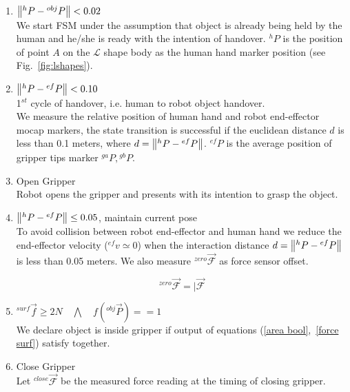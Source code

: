 \documentclass[a4paper, 12pt, oneside]{Thesis}  %
\begin{document}
\begin{enumerate}[start=0,label={\bf{t}\arabic*:}]
    \item $\norm{{}^h{P} - {}^{obj}{P}} < 0.02$\\
    We start FSM under the assumption that object is already being held by the human and he/she is ready with the intention of handover. ${}^h{P}$ is the position of point $A$ on the $\mathcal{L}$ shape body as the human hand marker position (see Fig.~\ref{fig:lshapes}).
    
    
    \item $\norm{{}^h{P} - {}^{ef}{P}} < 0.10$\\
    1$^{st}$ cycle of handover, i.e. human to robot object handover.\\
    We measure the relative position of human hand and robot end-effector mocap markers, the state transition is successful if the euclidean distance $d$ is less than 0.1 meters, where $d = \norm{{}^h{P} - {}^{ef}{P}}$. ${}^{ef}{P}$ is the average position of gripper tips marker ${}^{ga}P, {}^{gb}P$. 
    
    \item Open Gripper\\
    Robot opens the gripper and presents with its intention to grasp the object.
    
    \item $\norm{{}^h{P} - {}^{ef}{P}} \leq 0.05$, maintain current pose\\
    To avoid collision between robot end-effector and human hand we reduce the end-effector velocity (${}^{ef}v\simeq0$) when the interaction distance $d = \norm{{}^h{P} - {}^{ef}{P}}$ is less than 0.05 meters. We also measure ${}^{zero}\vec{\mathcal{F}}$ as force sensor offset.

    \begin{equation}\label{Fzero}
        {}^{zero}\vec{\mathcal{F}} = \vert{\vec{\mathcal{F}}}
    \end{equation}

    \item ${}^{surf}\vec{f} \geq 2N \quad \bigwedge \quad f({}^{obj}\vec{P})  == 1$\\
    We declare object is inside gripper if output of equations (\ref{area bool},~\ref{force surf}) satisfy together.
    
    \item Close Gripper\\
    Let ${}^{close}\vec{\mathcal{F}}$ be the measured force reading at the timing of closing gripper.
        

\end{enumerate}
\end{document}
